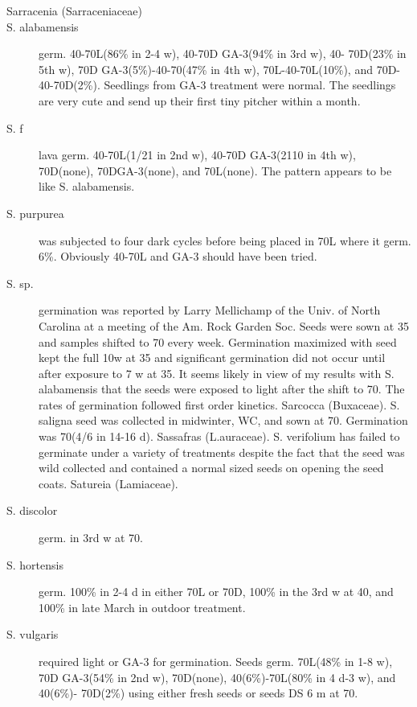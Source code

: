 \begin{description}
\item[Sarracenia (Sarraceniaceae)]
\item[S. alabamensis] germ. 40-70L(86\% in 2-4 w), 40-70D GA-3(94\% in 3rd w), 40-
70D(23\% in 5th w), 70D GA-3(5\%)-40-70(47\% in 4th w), 70L-40-70L(10\%), and 70D-
40-70D(2\%). Seedlings from GA-3 treatment were normal. The seedlings are very
cute and send up their first tiny pitcher within a month.
\item[S. f] lava germ. 40-70L(1/21 in 2nd w), 40-70D GA-3(2110 in 4th w), 70D(none),
70DGA-3(none), and 70L(none). The pattern appears to be like S. alabamensis.
\item[S. purpurea] was subjected to four dark cycles before being placed in 70L
where it germ. 6\%. Obviously 40-70L and GA-3 should have been tried.
\item[S. sp.] germination was reported by Larry Mellichamp of the Univ. of North
Carolina at a meeting of the Am. Rock Garden Soc. Seeds were sown at 35 and
samples shifted to 70 every week. Germination maximized with seed kept the full 10w
at 35 and significant germination did not occur until after exposure to 7 w at 35. It
seems likely in view of my results with S. alabamensis that the seeds were exposed to
light after the shift to 70. The rates of germination followed first order kinetics.
Sarcocca (Buxaceae). S. saligna seed was collected in midwinter, WC, and
sown at 70. Germination was 70(4/6 in 14-16 d).
Sassafras (L.auraceae). S. verifolium has failed to germinate under a
variety of treatments despite the fact that the seed was wild collected and contained a
normal sized seeds on opening the seed coats.
Satureia (Lamiaceae).
\item[S. discolor] germ. in 3rd w at 70.
\item[S. hortensis] germ. 100\% in 2-4 d in either 70L or 70D, 100\% in the 3rd w at 40,
and 100\% in late March in outdoor treatment.
\item[S. vulgaris] required light or GA-3 for germination. Seeds germ. 70L(48\% in 1-8
w), 70D GA-3(54\% in 2nd w), 70D(none), 40(6\%)-70L(80\% in 4 d-3 w), and 40(6\%)-
70D(2\%) using either fresh seeds or seeds DS 6 m at 70.


\end{description}
